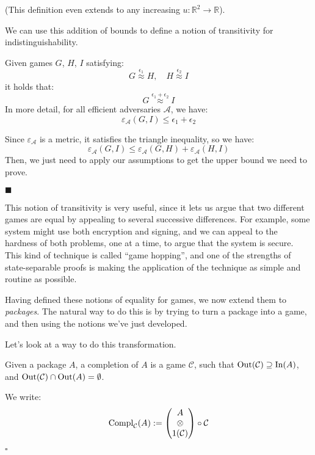 (This definition even extends to any increasing $u : \mathbb{R}^2 \to \mathbb{R}$).

We can use this addition of bounds to define a notion of transitivity
for indistinguishability.

\begin{lemma}
    Given games $G$, $H$, $I$ satisfying:
    $$
    G \overset{\epsilon_1}{\approx} H, \quad H \overset{\epsilon_2}{\approx} I
    $$
    it holds that:
    $$
    G \overset{\epsilon_1 + \epsilon_2}{\approx} I
    $$
    In more detail, for all efficient adversaries $\mathcal{A}$, we have:
    $$
    \varepsilon_{\mathcal{A}}(G, I) \leq \epsilon_1 + \epsilon_2
    $$

     Since $\varepsilon_{\mathcal{A}}$ is a metric, it
    satisfies the triangle inequality, so we have:
    $$
    \varepsilon_{\mathcal{A}}(G, I) \leq \varepsilon_{\mathcal{A}}(G, H) + \varepsilon_{\mathcal{A}}(H, I)
    $$
    Then, we just need to apply our assumptions to get the upper bound we 
    need to prove.

    $\blacksquare$
\end{lemma}

This notion of transitivity is very useful, since it lets us argue
that two different games are equal by appealing to several successive
differences.
For example, some system might use both encryption and signing,
and we can appeal to the hardness of both problems, one at a time,
to argue that the system is secure.
This kind of technique is called ``game hopping'',
and one of the strengths of state-separable proofs is making
the application of the technique as simple and routine as possible.

Having defined these notions of equality for games,
we now extend them to \emph{packages}.
The natural way to do this is by trying to turn
a package into a game, and then using the notions we've just developed.

Let's look at a way to do this transformation.

\begin{definition}[Completion]
    Given a package $A$, a completion of $A$ is a game $\mathcal{C}$,
    such that $\text{Out}(\mathcal{C}) \supseteq \text{In}(A)$,
    and $\text{Out}(\mathcal{C}) \cap \text{Out}(A) = \emptyset$.

    We write:
    $$
    \text{Compl}_{\mathcal{C}}(A) := \begin{pmatrix}
        A\cr
        \otimes\cr
        1(\mathcal{C})
    \end{pmatrix}
    \circ \mathcal{C}
    $$

    $\square$
\end{definition}

